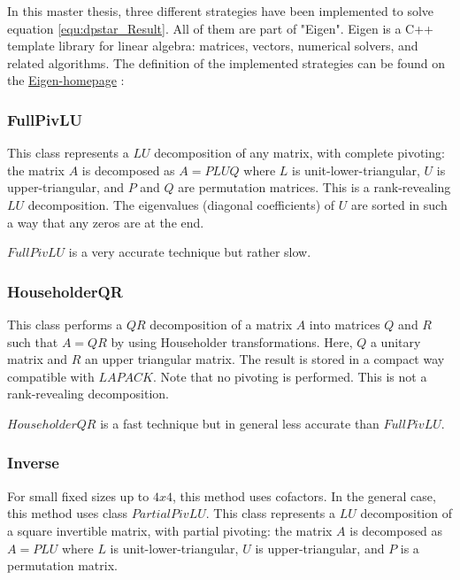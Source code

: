 In this master thesis, three different strategies have been implemented to solve equation \ref{equ:dpstar_Result}.
All of them are part of "Eigen". Eigen is a C++ template library for linear algebra: matrices, vectors, numerical solvers, and related algorithms. The definition of the implemented strategies can be found on the  \href{http://eigen.tuxfamily.org/index.php?title=Main_Page}{Eigen-homepage} \cite{Eigen}:

\newpage

\subsubsection{FullPivLU}

This class represents a $LU$ decomposition of any matrix, with complete pivoting: the matrix $A$ is decomposed as $A = PLUQ$ where $L$ is unit-lower-triangular, $U$ is upper-triangular, and $P$ and $Q$ are permutation matrices. This is a rank-revealing $LU$ decomposition. The eigenvalues (diagonal coefficients) of $U$ are sorted in such a way that any zeros are at the end. \newline

$FullPivLU$ is a very accurate technique but rather slow.

\subsubsection{HouseholderQR}

This class performs a $QR$ decomposition of a matrix $A$ into matrices $Q$ and $R$ such that $A = QR$ by using Householder transformations. Here, $Q$ a unitary matrix and $R$ an upper triangular matrix. The result is stored in a compact way compatible with $LAPACK$. Note that no pivoting is performed. This is not a rank-revealing decomposition.\newline

$HouseholderQR$ is a fast technique but in general less accurate than $FullPivLU$.

\subsubsection{Inverse}
For small fixed sizes up to $4x4$, this method uses cofactors. In the general case, this method uses class $PartialPivLU$. This class represents a $LU$ decomposition of a square invertible matrix, with partial pivoting: the matrix $A$ is decomposed as $A = PLU$ where $L$ is unit-lower-triangular, $U$ is upper-triangular, and $P$ is a permutation matrix. \newline

